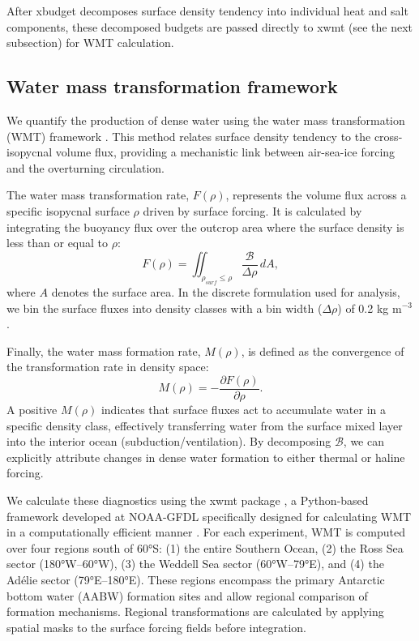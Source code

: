 \documentclass[pdflatex,sn-nature]{sn-jnl}
\begin{document}
After xbudget decomposes surface density tendency into individual heat and salt components, these decomposed budgets are passed directly to xwmt (see the next subsection) for WMT calculation.


\subsection{Water mass transformation framework}

We quantify the production of dense water using the water mass transformation (WMT) framework \cite{Walin1982,Speer1992}. This method relates surface density tendency to the cross-isopycnal volume flux, providing a mechanistic link between air-sea-ice forcing and the overturning circulation.

The water mass transformation rate, $F(\rho)$, represents the volume flux across a specific isopycnal surface $\rho$ driven by surface forcing. It is calculated by integrating the buoyancy flux over the outcrop area where the surface density is less than or equal to $\rho$:
\begin{equation}
F(\rho) = \iint_{\rho_{surf} \le \rho} \frac{\mathcal{B}}{\Delta \rho} \, dA,
\end{equation}
where $A$ denotes the surface area. In the discrete formulation used for analysis, we bin the surface fluxes into density classes with a bin width ($\Delta \rho$) of 0.2 kg m$^{-3}$.

Finally, the water mass formation rate, $M(\rho)$, is defined as the convergence of the transformation rate in density space:
\begin{equation}
M(\rho) = - \frac{\partial F(\rho)}{\partial \rho}.
\end{equation}
A positive $M(\rho)$ indicates that surface fluxes act to accumulate water in a specific density class, effectively transferring water from the surface mixed layer into the interior ocean (subduction/ventilation). By decomposing $\mathcal{B}$, we can explicitly attribute changes in dense water formation to either thermal or haline forcing.

We calculate these diagnostics using the xwmt package \cite{xwmt2024}, a Python-based framework developed at NOAA-GFDL specifically designed for calculating WMT in a computationally efficient manner \cite{drake2025water}. For each experiment, WMT is computed over four regions south of 60°S: (1) the entire Southern Ocean, (2) the Ross Sea sector (180°W--60°W), (3) the Weddell Sea sector (60°W--79°E), and (4) the Adélie sector (79°E--180°E). These regions encompass the primary Antarctic bottom water (AABW) formation sites and allow regional comparison of formation mechanisms. Regional transformations are calculated by applying spatial masks to the surface forcing fields before integration.
\end{document}
